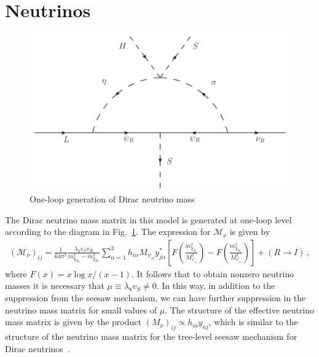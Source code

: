 \documentclass[12pt]{article}
\begin{document}
\section{Neutrinos}
\label{sec:Neutrinos}
%
\begin{figure}
\centering
\includegraphics[scale=0.75]{Neutrino_Loop.pdf}
\caption{One-loop generation of Dirac neutrino mass}
\label{fig:zee}
\end{figure}
%
 The Dirac neutrino mass matrix in this model is generated at one-loop level according to the diagram in  Fig.~\ref{fig:zee}. The expression for $\mathcal{M}_{\nu}$ is given by
%
\begin{align}
(\mathcal{M}_{\nu})_{ij} = \frac{1}{64 \pi^{2}}  \frac{\lambda_8 v_S v_H} {m_{\chi_{R_2}}^{2}-m_{\chi_{R_1}}^{2}}\sum_{\alpha=1}^{3} h_{i \alpha} M_{\psi_{\alpha}}y^{*}_{j\alpha}\left[ F\left( \frac{m_{\chi_{R_2}}^{2}}{M_{\psi_{\alpha}}^{2}} \right) - F\left( \frac{m_{\chi_{R_1}}^{2}}{M_{\psi_{\alpha}}^{2}} \right) \right] + (R \to I)\,,
\end{align}
%
where $F(x) =x \log x/(x-1)$. 
It follows that to obtain nonzero neutrino masses it is necessary that $\mu\equiv\lambda_8 v_S \neq 0$. In this
way, in addition to the suppression from the seesaw mechanism, we can
have further suppression in the neutrino mass matrix for small values
of $\mu$.
The structure of the effective neutrino mass matrix is given by the
product $(M_{\nu})_{ij} \propto h_{i a} y_{a j}$, which is similar to
the structure of the neutrino mass matrix for the tree-level seesaw
mechanism for Dirac neutrinos~\cite{Chulia:2016ngi}. 
\end{document}
